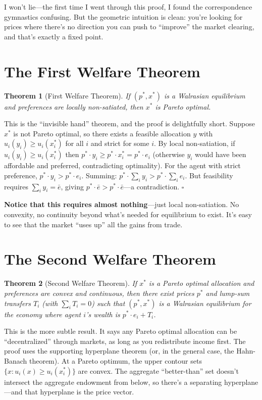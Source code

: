 \documentclass[11pt]{article}
\newtheorem{theorem}{Theorem}
\begin{document}
I won't lie---the first time I went through this proof, I found the correspondence gymnastics confusing. But the geometric intuition is clean: you're looking for prices where there's no direction you can push to ``improve'' the market clearing, and that's exactly a fixed point.

\section{The First Welfare Theorem}

\begin{theorem}[First Welfare Theorem]
If $(p^*, x^*)$ is a Walrasian equilibrium and preferences are locally non-satiated, then $x^*$ is Pareto optimal.
\end{theorem}

This is the ``invisible hand'' theorem, and the proof is delightfully short. Suppose $x^*$ is not Pareto optimal, so there exists a feasible allocation $y$ with $u_i(y_i) \geq u_i(x_i^*)$ for all $i$ and strict for some $i$. By local non-satiation, if $u_i(y_i) \geq u_i(x_i^*)$ then $p^* \cdot y_i \geq p^* \cdot x_i^* = p^* \cdot e_i$ (otherwise $y_i$ would have been affordable and preferred, contradicting optimality). For the agent with strict preference, $p^* \cdot y_i > p^* \cdot e_i$. Summing: $p^* \cdot \sum_i y_i > p^* \cdot \sum_i e_i$. But feasibility requires $\sum_i y_i = \bar{e}$, giving $p^* \cdot \bar{e} > p^* \cdot \bar{e}$---a contradiction. $\square$

\textbf{Notice that this requires almost nothing}---just local non-satiation. No convexity, no continuity beyond what's needed for equilibrium to exist. It's easy to see that the market ``uses up'' all the gains from trade.

\section{The Second Welfare Theorem}

\begin{theorem}[Second Welfare Theorem]
If $x^*$ is a Pareto optimal allocation and preferences are convex and continuous, then there exist prices $p^*$ and lump-sum transfers $T_i$ (with $\sum_i T_i = 0$) such that $(p^*, x^*)$ is a Walrasian equilibrium for the economy where agent $i$'s wealth is $p^* \cdot e_i + T_i$.
\end{theorem}

This is the more subtle result. It says any Pareto optimal allocation can be ``decentralized'' through markets, as long as you redistribute income first. The proof uses the supporting hyperplane theorem (or, in the general case, the Hahn-Banach theorem). At a Pareto optimum, the upper contour sets $\{x : u_i(x) \geq u_i(x_i^*)\}$ are convex. The aggregate ``better-than'' set doesn't intersect the aggregate endowment from below, so there's a separating hyperplane---and that hyperplane is the price vector.
\end{document}
